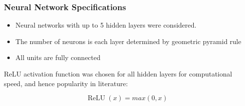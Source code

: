 \documentclass[]{beamer}
\begin{document}
\begin{frame}
\frametitle{Neural Network Specifications}

\begin{itemize}
\item Neural networks with up to 5 hidden layers were considered. 

\item The number of neurons is each layer determined by geometric pyramid rule \citep{masters_practical_1993}

\item All units are fully connected
\end{itemize}

ReLU activation function was chosen for all hidden layers for computational speed, and hence popularity in literature:

\begin{equation}
\operatorname{ReLU}(x) = max(0, x)
\end{equation}
\end{frame}

\end{document}

